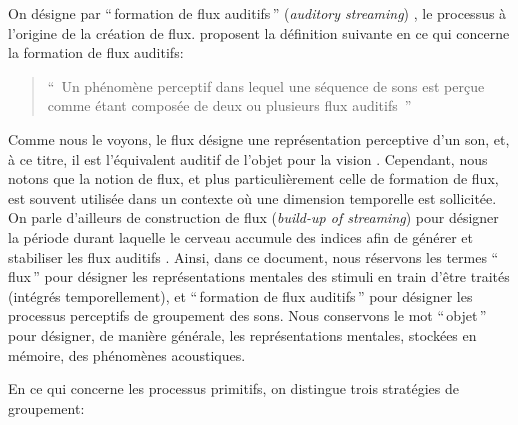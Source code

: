 {On désigne par ``\,formation de flux auditifs\,'' (\emph{auditory streaming}) , le processus à l'origine de la création de flux. \citep{winkler2009modeling} proposent la définition suivante en ce qui concerne la formation de flux auditifs:

\begin{quote}
``\, Un phénomène perceptif dans lequel une séquence de sons est perçue comme étant composée de deux ou plusieurs flux auditifs \,''
\end{quote}

Comme nous le voyons, le flux désigne une représentation perceptive d'un son, et, à ce titre, il est l'équivalent auditif de l'objet pour la vision \citep[p. 11]{bregman1994auditory}. Cependant, nous notons que la notion de flux, et plus particulièrement celle de formation de flux, est souvent utilisée dans un contexte où une dimension temporelle est sollicitée. On parle d'ailleurs de construction de flux (\emph{build-up of streaming}) pour désigner la période durant laquelle le cerveau accumule des indices afin de générer et stabiliser les flux auditifs  \citep{cusack2004effects,snyder2007toward}. Ainsi, dans ce document, nous réservons les termes ``\,flux\,'' pour désigner les représentations mentales des stimuli en train d'être traités (intégrés temporellement), et ``\,formation de flux auditifs\,'' pour désigner les processus perceptifs de groupement des sons. Nous conservons le mot ``\,objet\,'' pour désigner, de manière générale, les représentations mentales, stockées en mémoire, des phénomènes acoustiques.

En ce qui concerne les processus primitifs, on distingue trois stratégies de groupement:

}
